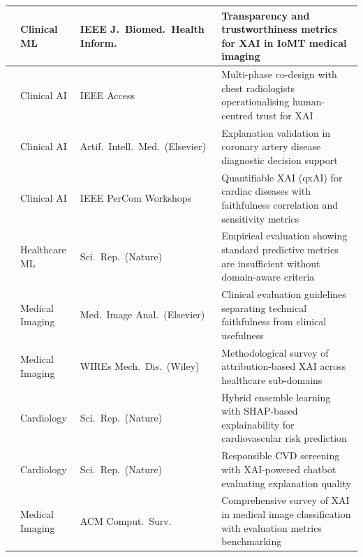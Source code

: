 \begin{longtable}{|p{3cm}|p{2.5cm}|p{3cm}|p{5.5cm}|}

\cite{10328849} & Clinical ML & IEEE J.\ Biomed.\ Health Inform. & Transparency and trustworthiness metrics for XAI in IoMT medical imaging \\
\hline
\cite{11355720} & Clinical AI & IEEE Access & Multi-phase co-design with chest radiologists operationalising human-centred trust for XAI \\
\hline
\cite{Kukar2011} & Clinical AI & Artif.\ Intell.\ Med.\ (Elsevier) & Explanation validation in coronary artery disease diagnostic decision support \\
\hline
\cite{Pandey2024} & Clinical AI & IEEE PerCom Workshops & Quantifiable XAI (qxAI) for cardiac diseases with faithfulness correlation and sensitivity metrics \\
\hline
\cite{hicks2022evaluation} & Healthcare ML & Sci.\ Rep.\ (Nature) & Empirical evaluation showing standard predictive metrics are insufficient without domain-aware criteria \\
\hline


\cite{jin2023guidelines} & Medical Imaging & Med.\ Image Anal.\ (Elsevier) & Clinical evaluation guidelines separating technical faithfulness from clinical usefulness \\
\hline
\cite{jin2022explainable} & Medical Imaging & WIREs Mech.\ Dis.\ (Wiley) & Methodological survey of attribution-based XAI across healthcare sub-domains \\
\hline
\cite{shah2025explainable} & Cardiology & Sci.\ Rep.\ (Nature) & Hybrid ensemble learning with SHAP-based explainability for cardiovascular risk prediction \\
\hline
\cite{muneer2025blockchain} & Cardiology & Sci.\ Rep.\ (Nature) & Responsible CVD screening with XAI-powered chatbot evaluating explanation quality \\
\hline
\cite{Patricio2023} & Medical Imaging & ACM Comput.\ Surv. & Comprehensive survey of XAI in medical image classification with evaluation metrics benchmarking \\
\hline

\end{longtable}
